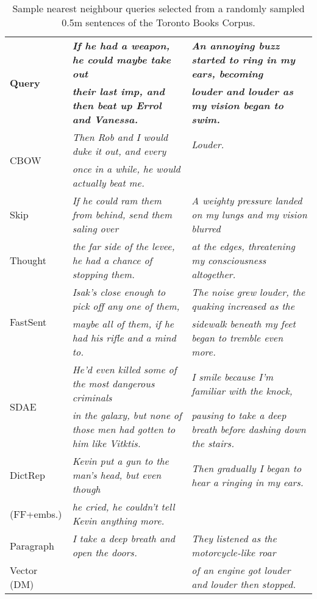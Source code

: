 \documentclass[11pt,letterpaper]{article}
\begin{document}
\begin{table*}[ht]
\begin{adjustwidth}{-1cm}{}
\renewcommand{\tabcolsep}{4.6pt}
\footnotesize
  \begin{center}
      {
        \begin{tabular}{l|l|l}
           \multirow{2}{*}{\bf Query} &  \bf \emph{If he had a weapon, he could maybe take out} & \bf \emph{An annoying buzz started to ring in my ears, becoming}  \\
           &\bf \emph{their last imp, and then beat up Errol and Vanessa.} & \bf  \emph{louder and louder as my vision began to swim. } \\
\hline
\hline
           \multirow{2}{*}{CBOW} &  \emph{Then Rob and I would duke it out, and every} &  \emph{Louder.}  \\
           &\emph{once in a while, he would actually beat me.} & 
\\
\hline
           \multirow{1}{*}{Skip} &  \emph{If he could ram them from behind, send them saling over } &  \emph{A weighty pressure landed on my lungs and my vision blurred} \\
           Thought&\emph{the far side of the levee, he had a chance of stopping them.} &  \emph{at the edges, threatening my consciousness altogether.}
\\
\hline
           \multirow{2}{*}{FastSent} &  \emph{Isak's close enough to pick off any one of them,} &  \emph{The noise grew louder, the quaking increased as the} \\
           &\emph{maybe all of them, if he had his rifle and a mind to. } &  \emph{sidewalk beneath my feet began to tremble even more.}
\\
\hline

           \multirow{2}{*}{SDAE} &  \emph{He'd even killed some of the most dangerous criminals} &  \emph{I smile because I'm familiar with the knock,} \\
           &\emph{in the galaxy, but none of those men had gotten to him like Vitktis.} &  \emph{pausing to take a deep breath before dashing down the stairs.}
\\
\hline
           \multirow{1}{*}{DictRep} &  \emph{Kevin put a gun to the man's head, but even though} &  \emph{Then gradually I began to hear a ringing in my ears.}  \\
         (FF+embs.)  &\emph{he cried, he couldn't tell Kevin anything more.} & \emph{}
\\\hline
           \multirow{1}{*}{Paragraph} &  \emph{I take a deep breath and open the doors.} &  \emph{They listened as the motorcycle-like roar}  \\
       Vector (DM) & & \emph{of an engine got louder and louder then stopped.}
\\
        \end{tabular}
    }
    \caption{\label{neighbours}Sample nearest neighbour queries selected from a randomly sampled 0.5m sentences of the Toronto Books Corpus.}
  \end{center}
  \vspace*{-4ex}
  \end{adjustwidth}
\end{table*}
\end{document}
